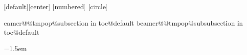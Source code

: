 
\usepackage{textpos}
\usepackage{makebox}
\usepackage{inputenc}
\usepackage{xcolor}
\usepackage{hyperref}
\usepackage{caption}
\usepackage{subfig}
\captionsetup{justification=centering,singlelinecheck=false} %
\usepackage{xecolor}
\usepackage{graphicx}
\usepackage{algorithm}
\usepackage{algorithmic}

\usepackage{amsthm,amssymb,amsmath}

\usepackage{appendixnumberbeamer}

\usepackage{colortbl}

\graphicspath{{./img/}}

\usepackage[
  extrafootnotefeatures,
  localise=on,
  mathdigits=default,
  inlinemathdigits=default,
  displaymathdigits=default %
]{xepersian}





[default][center]%
[numbered]{}%
[circle] %



\makeatletter
\expandafter\let\csname beamer@@tmpop@subsection in toc@default\endcsname\relax
\expandafter\let\csname beamer@@tmpop@subsubsection in toc@default\endcsname\relax
{}
{\leavevmode\rightskip=1.5em\inserttocsubsection\par}

